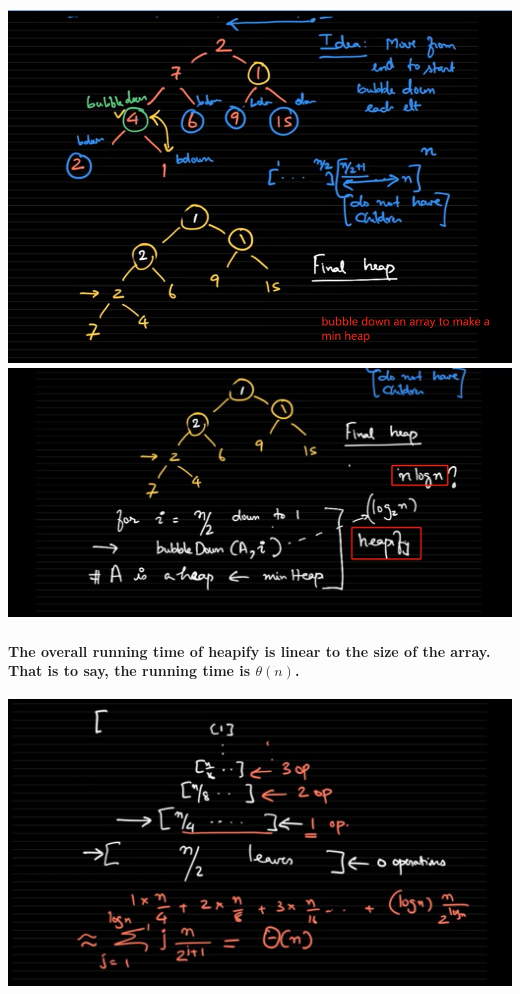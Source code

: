 \documentclass{article}
\begin{document}
\includegraphics[width=\textwidth]{array2minheap.png}
\includegraphics[width=\textwidth]{heapify.png}



\paragraph{The overall running time of heapify is linear to the size of the array. That is to say, the running time is $\theta(n)$.\\}


\includegraphics[width=\textwidth]{heapifyrunningtime.png}
\end{document}

